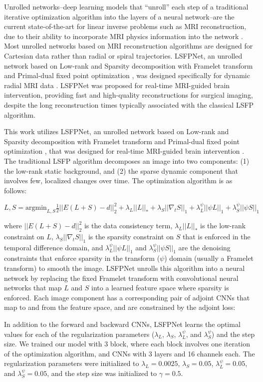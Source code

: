 \documentclass[runningheads]{llncs}
\begin{document}
Unrolled networks--deep learning models that ``unroll'' each step of a traditional iterative optimization algorithm into the layers of a neural network--are the current state-of-the-art for linear inverse problems such as MRI reconstruction, due to their ability to incorporate MRI physics information into the network \cite{Hammernik2017Variational}. Most unrolled networks based on MRI reconstruction algorithms are designed for Cartesian data rather than radial or spiral trajectories. LSFPNet, an unrolled network based on Low-rank and Sparsity decomposition with Framelet transform and Primal-dual fixed point optimization \cite{9678015}, was designed specifically for dynamic radial MRI data \cite{He2023Unrolled}. LSFPNet was proposed for real-time MRI-guided brain intervention, providing fast and high-quality reconstructions for surgical imaging, despite the long reconstruction times typically associated with the classical LSFP algorithm. 

This work utilizes LSFPNet, an unrolled network based on Low-rank and Sparsity decomposition with Framelet transform and Primal-dual fixed point optimization \cite{9678015}, that was designed for real-time MRI-guided brain intervention \cite{He2023Unrolled}. The traditional LSFP algorithm decomposes an image into two components: (1) the low-rank static background, and (2) the sparse dynamic component that involves few, localized changes over time. The optimization algorithm is as follows:

${L,S} = \text{argmin}_{L,S} \frac{1}{2} ||E(L+S) - d ||_{2}^{2} + \lambda_{L}||L||_{*} + \lambda_{S}||\nabla_{t}S||_1 + \lambda_{L}^\psi||\psi L||_1 + \lambda_{S}^\psi||\psi S||_1$

where $||E(L+S) - d ||_{2}^{2}$ is the data consistency term, $\lambda_{L}||L||_{*}$ is the low-rank constraint on $L$, $\lambda_{S}||\nabla_{t}S||_1$ is the sparsity constraint on $S$ that is enforced in the temporal difference domain, and $\lambda_{L}^\psi||\psi L||_1$ and $\lambda_{S}^\psi||\psi S||_1$ are the denoising constraints that enforce sparsity in the transform ($\psi$) domain (usually a Framelet transform) to smooth the image. LSFPNet unrolls this algorithm into a neural network by replacing the fixed Framelet transform with convolutional neural networks that map $L$ and $S$ into a learned feature space where sparsity is enforced. Each image component has a corresponding pair of adjoint CNNs that map to and from the feature space, and are constrained by the adjoint loss:

In addition to the forward and backward CNNs, LSFPNet learns the optimal values for each of the regularization parameters ($\lambda_{L}$, $\lambda_{S}$, $\lambda_{L}^\psi$, and $\lambda_{S}^\psi$) and the step size. We trained our model with 3 block, where each block involves one iteration of the optimization algorithm, and CNNs with 3 layers and 16 channels each. The regularization parameters were initialized to $\lambda_{L}=0.0025$, $\lambda_{S}=0.05$, $\lambda_{L}^\psi=0.05$, and $\lambda_{S}^\psi=0.05$, and the step size was initialized to $\gamma=0.5$.
\end{document}
